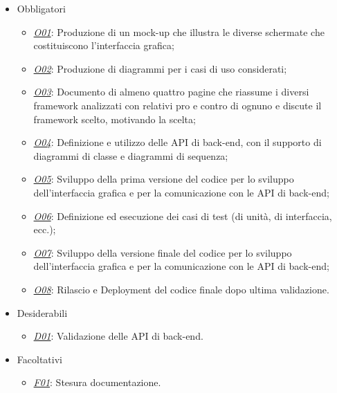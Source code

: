 \begin{itemize}
	\item Obbligatori
	\begin{itemize}
		\item \underline{\textit{O01}}: Produzione di un mock-up che illustra le diverse schermate che costituiscono l'interfaccia grafica;
	 \item \underline{\textit{O02}}: Produzione di diagrammi per i casi di uso considerati;
	\item \underline{\textit{O03}}: Documento di almeno quattro pagine che riassume i diversi framework analizzati con relativi pro e contro di ognuno e discute il framework scelto, motivando la scelta;
	 \item \underline{\textit{O04}}: Definizione e utilizzo delle \gls{API} di back-end, con il supporto di diagrammi di classe e diagrammi di sequenza;
\item \underline{\textit{O05}}: Sviluppo della prima versione del codice per lo sviluppo dell'interfaccia grafica e per la comunicazione con le \gls{API} di back-end;
\item \underline{\textit{O06}}: Definizione ed esecuzione dei casi di test (di unità, di interfaccia, ecc.);
\item \underline{\textit{O07}}: Sviluppo della versione finale del codice per lo sviluppo dell'interfaccia grafica e per la comunicazione con le \gls{API} di back-end;
\item \underline{\textit{O08}}: Rilascio e Deployment del codice finale dopo ultima validazione.
	\end{itemize}
	
	\item Desiderabili 
	\begin{itemize}
		\item \underline{\textit{D01}}: Validazione delle \gls{API} di back-end. 
	\end{itemize}
	
	\item Facoltativi
	\begin{itemize}
		\item \underline{\textit{F01}}: Stesura documentazione.
	\end{itemize} 
\end{itemize}


\clearpage

